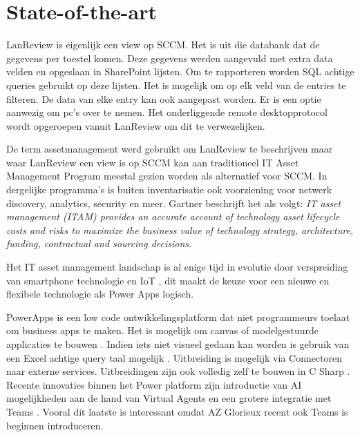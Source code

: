\section{State-of-the-art}
\label{sec:state-of-the-art}


LanReview is eigenlijk een view op SCCM. Het is uit die databank dat de gegevens per toestel komen. Deze gegevens werden aangevuld met extra data velden en opgeslaan in SharePoint lijsten. Om te rapporteren worden SQL achtige queries gebruikt op deze lijsten. Het is mogelijk om op elk veld van de entries te filteren. De data van elke entry kan ook aangepast worden. Er is een optie aanwezig om pc's over te nemen. Het onderliggende remote desktopprotocol wordt opgeroepen vanuit LanReview om dit te verwezelijken.

De term assetmanagement werd gebruikt om LanReview te beschrijven maar waar LanReview een view is op SCCM kan aan traditioneel IT Asset Management Program meestal gezien worden als alternatief voor SCCM. In dergelijke programma's is buiten inventarisatie ook voorziening voor netwerk discovery, analytics, security en meer. Gartner \parencite{Gartner2020} beschrijft het als volgt: \emph{IT asset management (ITAM) provides an accurate account of technology asset lifecycle costs and risks to maximize the business value of technology strategy, architecture, funding, contractual and sourcing decisions.}

Het IT asset management landschap is al enige tijd in evolutie door verspreiding van smartphone technologie en  IoT \parencite{Badnakhe2020}, dit maakt de keuze voor een nieuwe en flexibele technologie als Power Apps logisch.

PowerApps is een low code ontwikkelingsplatform dat niet programmeurs toelaat om business apps te maken. Het is mogelijk om canvas of modelgestuurde applicaties te bouwen \parencite{Knight2019}. Indien iets niet visueel gedaan kan worden is gebruik van een Excel achtige query taal mogelijk \parencite{Owen2019}. Uitbreiding is mogelijk via Connectoren naar externe services. Uitbreidingen zijn ook volledig zelf te bouwen in C Sharp \parencite{Vivek2019}.
Recente innovaties binnen het Power platform zijn introductie van AI mogelijkheden aan de hand van Virtual Agents en een grotere integratie met Teams \parencite{Cunningham2019}. Vooral dit laatste is interessant omdat AZ Glorieux recent ook Teams is beginnen introduceren.

